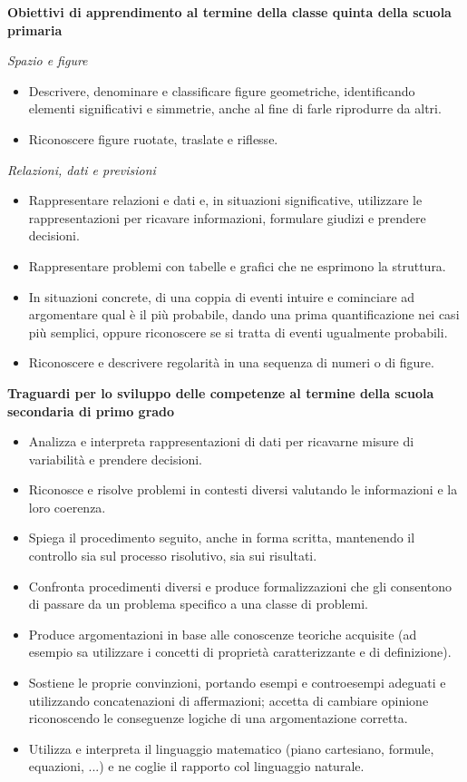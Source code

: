 \documentclass[12pt]{report}
\begin{document}
\medskip
\noindent \textbf{Obiettivi di apprendimento al termine della classe quinta della scuola primaria}
\begin{description}
	\item \textit{Spazio e figure}
	\begin{itemize}
		\item Descrivere, denominare e classificare figure geometriche, identificando elementi significativi e simmetrie, anche al fine di farle riprodurre da altri.
		\item Riconoscere figure ruotate, traslate e riflesse.
	\end{itemize}
	\medskip
	\item \textit{Relazioni, dati e previsioni}
	\begin{itemize}
		\item Rappresentare relazioni e dati e, in situazioni significative, utilizzare le rappresentazioni per ricavare informazioni, formulare giudizi e prendere decisioni.
		\item Rappresentare problemi con tabelle e grafici che ne esprimono la struttura.
		\item In situazioni concrete, di una coppia di eventi intuire e cominciare ad argomentare qual è il più probabile, dando una prima quantificazione nei casi più semplici, oppure riconoscere se si tratta di eventi ugualmente probabili.
		\item Riconoscere e descrivere regolarità in una sequenza di numeri o di figure.
	\end{itemize}
\end{description}

\bigskip
\noindent \textbf{Traguardi per lo sviluppo delle competenze al termine della scuola secondaria di primo grado}
\begin{itemize}
	\item Analizza e interpreta rappresentazioni di dati per ricavarne misure di variabilità e prendere decisioni.
	\item Riconosce e risolve problemi in contesti diversi valutando le informazioni e la loro coerenza.
	\item Spiega il procedimento seguito, anche in forma scritta, mantenendo il controllo sia sul processo risolutivo, sia sui risultati.
	\item Confronta procedimenti diversi e produce formalizzazioni che gli consentono di passare da un problema specifico a una classe di problemi.
	\item Produce argomentazioni in base alle conoscenze teoriche acquisite (ad esempio sa utilizzare i concetti di proprietà caratterizzante e di definizione).
	\item Sostiene le proprie convinzioni, portando esempi e controesempi adeguati e utilizzando concatenazioni di affermazioni; accetta di cambiare opinione riconoscendo le conseguenze logiche di una argomentazione corretta.
	\item Utilizza e interpreta il linguaggio matematico (piano cartesiano, formule, equazioni, ...) e ne coglie il rapporto col linguaggio naturale.
\end{itemize}
\end{document}

